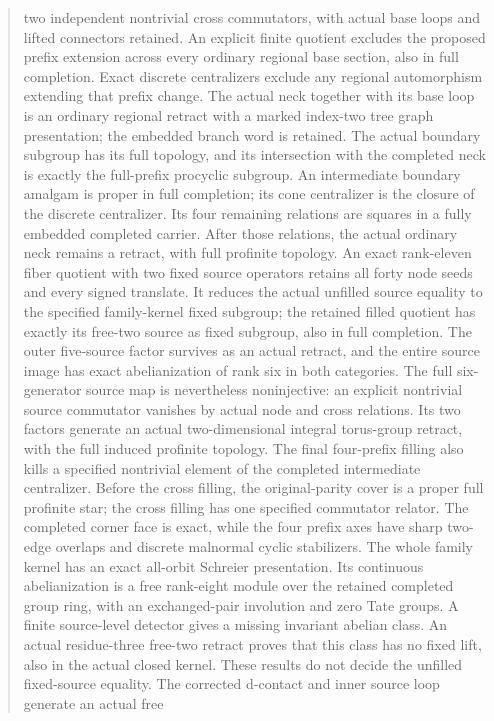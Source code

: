 \documentclass[11pt,a4paper]{article}
\begin{document}
\begin{abstract}
two independent nontrivial cross commutators, with actual base loops
and lifted connectors retained. An explicit finite quotient excludes the proposed prefix extension
across every ordinary regional base section, also in full completion.
Exact discrete centralizers exclude any regional automorphism extending
that prefix change. The actual neck together with its base loop is an
ordinary regional retract with a marked index-two tree graph presentation;
the embedded branch word is retained. The actual boundary subgroup
has its full topology, and its intersection with the completed neck is
exactly the full-prefix procyclic subgroup. An intermediate boundary
amalgam is proper in full completion; its cone centralizer is the closure
of the discrete centralizer. Its four remaining relations are squares
in a fully embedded completed carrier. After those relations, the actual
ordinary neck remains a retract, with full profinite topology. An exact
rank-eleven fiber quotient with two fixed source operators retains all
forty node seeds and every signed translate. It reduces the actual
unfilled source equality to the specified family-kernel fixed subgroup;
the retained filled quotient has exactly its free-two source as fixed
subgroup, also in full completion. The outer five-source factor survives
as an actual retract, and the entire source image has exact abelianization
of rank six in both categories. The full six-generator source map is
nevertheless noninjective: an explicit nontrivial source commutator
vanishes by actual node and cross relations. Its two factors generate
an actual two-dimensional integral torus-group retract, with the full
induced profinite topology. The final four-prefix filling also kills a
specified nontrivial element of the completed intermediate centralizer.
Before the cross filling, the original-parity cover is a proper full
profinite star; the cross filling has one specified commutator relator.
The completed corner face is exact, while the four prefix axes have
sharp two-edge overlaps and discrete malnormal cyclic stabilizers.
The whole family kernel has an exact all-orbit Schreier presentation.
Its continuous abelianization is a free rank-eight module over the
retained completed group ring, with an exchanged-pair involution and
zero Tate groups. A finite source-level detector gives a missing
invariant abelian class. An actual residue-three free-two retract
proves that this class has no fixed lift, also in the actual closed
kernel. These results do not decide the unfilled fixed-source equality.
The corrected d-contact and inner source loop generate an actual free

\end{abstract}
\end{document}
